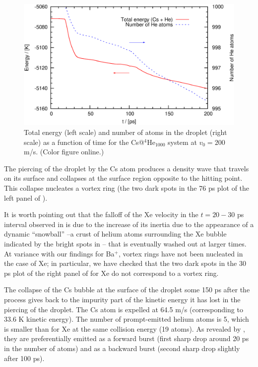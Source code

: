 \begin{figure}[!]
\centerline{\includegraphics[width=0.90\linewidth,clip]{fig5}}
\caption{\label{fig5-headon} 
Total energy  (left scale) and number of atoms in the droplet (right scale) as a function of time for the 
Cs@$^4$He$_{1000}$ system at $v_0 = 200$ m/s. (Color figure online.)
}
\end{figure}

 The piercing of the droplet by the Cs atom produces a density wave that travels on its surface and collapses at the surface region opposite to the hitting point.
 This collapse nucleates a 
 vortex ring (the two dark spots in the 76 ps plot of the left panel of )\citep{Lea14a}.
 
 It is worth pointing out that the falloff of the Xe velocity in the $t=20-30$ ps interval observed in   is due to the increase of its inertia
due to the appearance of a dynamic ``snowball''  --a crust of helium atoms surrounding the Xe bubble indicated by the bright spots in 
-- that is eventually washed out at larger times.
At variance with our findings for Ba$^+$\citep{Mat14}, vortex rings have not been nucleated in the case of Xe; in particular, we have checked that the two dark spots  in the 30 ps plot of the right panel of  for Xe do not correspond to a vortex ring. 

The collapse of the Cs bubble at the surface of the droplet some 150 ps after the process 
 gives back to the impurity part of the kinetic energy it has lost  in the 
 piercing of the droplet. The Cs atom is expelled at 64.5 m/s (corresponding to 33.6 K kinetic energy). 
The number of prompt-emitted helium atoms is 5, which is smaller than for Xe at the same collision energy (19 atoms).
As revealed by , they are  preferentially emitted as a forward  burst  (first sharp drop around 20 ps in the number of atoms) and as a 
backward burst  (second sharp drop slightly after 100 ps).
\clearpage{\pagestyle{empty}\cleardoublepage}